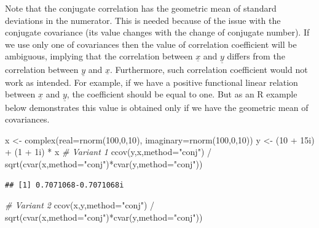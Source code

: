 \documentclass[
]{book}
\newenvironment{Shaded}{\begin{snugshade}}{\end{snugshade}}
\newcommand{\AttributeTok}[1]{\textcolor[rgb]{0.77,0.63,0.00}{#1}}
\newcommand{\CommentTok}[1]{\textcolor[rgb]{0.56,0.35,0.01}{\textit{#1}}}
\newcommand{\DecValTok}[1]{\textcolor[rgb]{0.00,0.00,0.81}{#1}}
\newcommand{\FunctionTok}[1]{\textcolor[rgb]{0.00,0.00,0.00}{#1}}
\newcommand{\NormalTok}[1]{#1}
\newcommand{\OtherTok}[1]{\textcolor[rgb]{0.56,0.35,0.01}{#1}}
\newcommand{\SpecialCharTok}[1]{\textcolor[rgb]{0.00,0.00,0.00}{#1}}
\newcommand{\StringTok}[1]{\textcolor[rgb]{0.31,0.60,0.02}{#1}}
\begin{document}
Note that the conjugate correlation has the geometric mean of standard deviations in the numerator. This is needed because of the issue with the conjugate covariance (its value changes with the change of conjugate number). If we use only one of covariances \citep[as done, for example, by][]{Panchev1971} then the value of correlation coefficient will be ambiguous, implying that the correlation between \(\underline{x}\) and \(\underline{y}\) differs from the correlation between \(\underline{y}\) and \(\underline{x}\). Furthermore, such correlation coefficient would not work as intended. For example, if we have a positive functional linear relation between \(\underline{x}\) and \(\underline{y}\), the coefficient should be equal to one. But as an R example below demonstrates this value is obtained only if we have the geometric mean of covariances.

\begin{Shaded}
\begin{Highlighting}[]
\NormalTok{x }\OtherTok{\textless{}{-}} \FunctionTok{complex}\NormalTok{(}\AttributeTok{real=}\FunctionTok{rnorm}\NormalTok{(}\DecValTok{100}\NormalTok{,}\DecValTok{0}\NormalTok{,}\DecValTok{10}\NormalTok{), }\AttributeTok{imaginary=}\FunctionTok{rnorm}\NormalTok{(}\DecValTok{100}\NormalTok{,}\DecValTok{0}\NormalTok{,}\DecValTok{10}\NormalTok{))}
\NormalTok{y }\OtherTok{\textless{}{-}}\NormalTok{ (}\DecValTok{10} \SpecialCharTok{+}\NormalTok{ 15i) }\SpecialCharTok{+}\NormalTok{ (}\DecValTok{1} \SpecialCharTok{+}\NormalTok{ 1i) }\SpecialCharTok{*}\NormalTok{ x}
\CommentTok{\# Variant 1}
\FunctionTok{ccov}\NormalTok{(y,x,}\AttributeTok{method=}\StringTok{"conj"}\NormalTok{) }\SpecialCharTok{/}
    \FunctionTok{sqrt}\NormalTok{(}\FunctionTok{cvar}\NormalTok{(x,}\AttributeTok{method=}\StringTok{"conj"}\NormalTok{)}\SpecialCharTok{*}\FunctionTok{cvar}\NormalTok{(y,}\AttributeTok{method=}\StringTok{"conj"}\NormalTok{))}
\end{Highlighting}
\end{Shaded}

\begin{verbatim}
## [1] 0.7071068-0.7071068i
\end{verbatim}

\begin{Shaded}
\begin{Highlighting}[]
\CommentTok{\# Variant 2}
\FunctionTok{ccov}\NormalTok{(x,y,}\AttributeTok{method=}\StringTok{"conj"}\NormalTok{) }\SpecialCharTok{/}
    \FunctionTok{sqrt}\NormalTok{(}\FunctionTok{cvar}\NormalTok{(x,}\AttributeTok{method=}\StringTok{"conj"}\NormalTok{)}\SpecialCharTok{*}\FunctionTok{cvar}\NormalTok{(y,}\AttributeTok{method=}\StringTok{"conj"}\NormalTok{))}
\end{Highlighting}
\end{Shaded}
\end{document}
